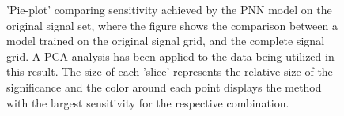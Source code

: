 \begin{figure}[H]
    \caption['Pie-plot'comparing sensitivity achieved by the \acs{PNN} model on the original signal set, where the figure shows the comparison between a model trained 
    on the original signal grid, and the complete signal grid.]{'Pie-plot' comparing sensitivity achieved by the \acs{PNN} model on the original signal set, where the figure 
    shows the comparison between a model trained on the original signal grid, and the complete signal grid. A \ac{PCA} analysis has been applied to the data being utilized 
    in this result. The size of each 'slice' represents the relative size of the significance and the color around each 
    point displays the method with the largest sensitivity for the respective combination.}
    \label{fig:BigVsLittleSetPNN}
\end{figure}
\newpage